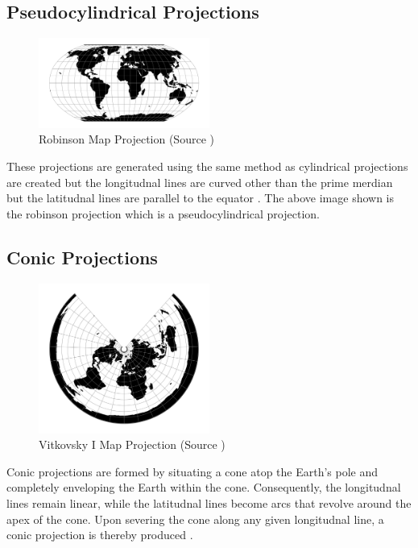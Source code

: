 \newpage
\subsection{Pseudocylindrical Projections}

\begin{figure}[h]
    \centering
    \includegraphics[width=0.5\textwidth]{figures/chapter-1/robinson.png}
    \caption{Robinson Map Projection (Source \cite{PROJ_SITE})}
    \label{fig:robinson-image}
\end{figure}


These projections are generated using the same method as cylindrical projections are created but the longitudnal lines are curved other than the prime merdian but the latitudnal lines are parallel to the equator \cite{GISGEO_Cylinder}.
The above image shown is the robinson projection which is a pseudocylindrical projection.

\subsection{Conic Projections}

\begin{figure}[h]
    \centering
    \includegraphics[width=0.5\textwidth]{figures/chapter-3/vitk1.png}
    \caption{Vitkovsky I Map Projection (Source \cite{PROJ_SITE})}
    \label{fig:vitkovsky-image}
\end{figure}
Conic projections are formed by situating a cone atop the Earth's pole and completely enveloping the Earth within the cone. Consequently, the longitudnal lines remain linear, while the latitudnal lines become arcs that revolve around the apex of the cone. Upon severing the cone along any given longitudnal line, a conic projection is thereby produced \cite{Snyder1982}.


